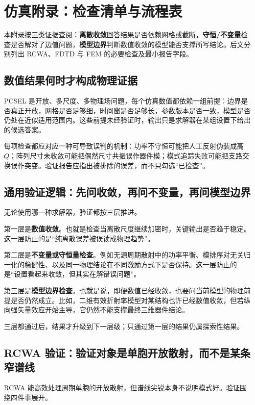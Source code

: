 ﻿%
\chapter{仿真附录：检查清单与流程表}
\label{ch:sim-appendix}

本附录按三类证据查阅：\textbf{离散收敛}回答结果是否依赖网格或截断，\textbf{守恒/不变量}检查是否解对了边值问题，\textbf{模型边界}判断数值收敛的模型能否支撑所写结论。后文分别列出 RCWA、FDTD 与 FEM 的必要检查及最小报告字段。

\section{数值结果何时才构成物理证据}
PCSEL 是开放、多尺度、多物理场问题，每个仿真数值都依赖一组前提：边界是否真正开放，网格是否足够细，时间窗是否足够长，参数版本是否一致，模型是否仍处在近似适用范围内。这些前提未经验证时，输出只是求解器在某组设置下给出的候选答案。

每项检查都应对应一种可导致误判的机制：功率不守恒可能把人工反射伪装成高 $Q$；阵列尺寸未收敛可能把偶然尺寸共振误作器件模；模式追踪失败可能把支路交换误作突变。验证报告应指出被排除的误差，而不只勾选“已检查”。

\section{通用验证逻辑：先问收敛，再问不变量，再问模型边界}
无论使用哪一种求解器，验证都按三层推进。

第一层是\textbf{数值收敛}。也就是检查当离散尺度继续加密时，关键输出是否趋于稳定。这一层防止的是“纯离散误差被误读成物理趋势”。

第二层是\textbf{不变量或守恒量检查}。例如无源周期散射中的功率平衡、模排序对无关归一化的稳健性、以及同一物理结论在不同激励方式下是否保持。这一层防止的是“设置看起来收敛，但其实在解错误问题”。

第三层是\textbf{模型边界检查}。也就是说，即便数值已经收敛，也要问当前模型的物理前提是否仍然成立。比如，二维有效折射率模型对某结构也许已经数值收敛，但若纵向强矢量效应开始主导，它仍然不能支撑最终三维器件结论。

三层都通过后，结果才升级到下一层级；只通过第一层的结果仍属探索性结果。

\section{RCWA 验证：验证对象是单胞开放散射，而不是某条窄谱线}
RCWA 能高效处理周期单胞的开放散射，但谱线尖锐本身不说明模式好。验证围绕四件事展开。

